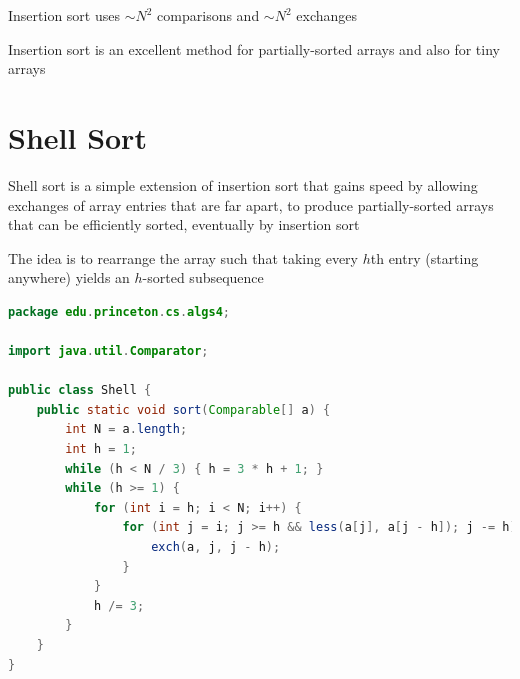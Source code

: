 \documentclass[8pt,a4paper,compress]{beamer}
\begin{document}
\begin{frame}[fragile]
\pause

Insertion sort uses $\sim N^2$ comparisons and $\sim N^2$ exchanges

\pause
\bigskip

Insertion sort is an excellent method for partially-sorted arrays and also for tiny arrays
\end{frame}

\section{Shell Sort}
\begin{frame}[fragile]
\pause

Shell sort is a simple extension of insertion sort that gains speed by allowing exchanges of array entries that are far apart, to produce partially-sorted arrays that can be efficiently sorted, eventually by insertion sort

\pause
\bigskip

The idea is to rearrange the array such that taking every $h$th entry (starting anywhere) yields an $h$-sorted subsequence

\pause
\bigskip

\begin{lstlisting}[language=Java]
package edu.princeton.cs.algs4;

import java.util.Comparator;

public class Shell {
    public static void sort(Comparable[] a) {
        int N = a.length; 
        int h = 1;
        while (h < N / 3) { h = 3 * h + 1; }
        while (h >= 1) {
            for (int i = h; i < N; i++) {
                for (int j = i; j >= h && less(a[j], a[j - h]); j -= h) {
                    exch(a, j, j - h);
                }
            }
            h /= 3;
        }    
    }
}
\end{lstlisting}
\end{frame}
\end{document}
